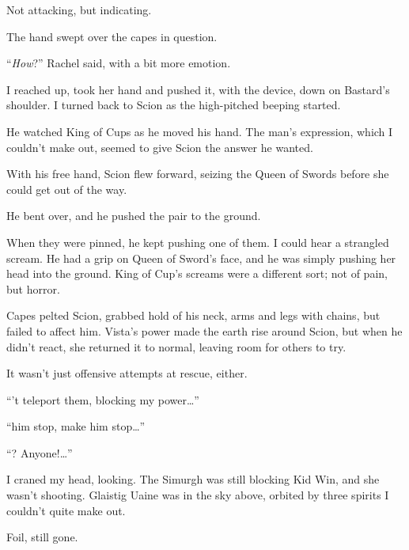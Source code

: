 Not attacking, but indicating.



The hand swept over the capes in question.



``\emph{How}?'' Rachel said, with a bit more emotion.



I reached up, took her hand and pushed it, with the device, down on Bastard's shoulder.  I turned back to Scion as the high-pitched beeping started.



He watched King of Cups as he moved his hand.  The man's expression, which I couldn't make out, seemed to give Scion the answer he wanted.



With his free hand, Scion flew forward, seizing the Queen of Swords before she could get out of the way.



He bent over, and he pushed the pair to the ground.



When they were pinned, he kept pushing one of them.  I could hear a strangled scream.  He had a grip on Queen of Sword's face, and he was simply pushing her head into the ground.  King of Cup's screams were a different sort; not of pain, but horror.



Capes pelted Scion, grabbed hold of his neck, arms and legs with chains, but failed to affect him.  Vista's power made the earth rise around Scion, but when he didn't react, she returned it to normal, leaving room for others to try.



It wasn't just offensive attempts at rescue, either.



``\ldotscan't teleport them, blocking my power\ldots''



``\ldotsmake him stop, make him stop\ldots''



``\ldotssomeone?  Anyone!\ldots''



I craned my head, looking.  The Simurgh was still blocking Kid Win, and she wasn't shooting.  Glaistig Uaine was in the sky above, orbited by three spirits I couldn't quite make out.



Foil, still gone.



